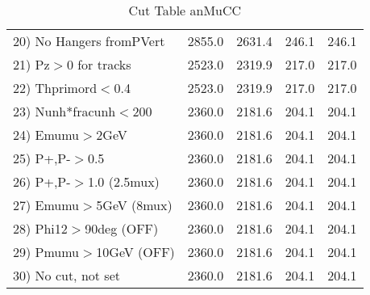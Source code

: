 \begin{table}[h!]
\begin{tabular}{||l||r|r|r|r||}
 20) No Hangers fromPVert &      2855.0 &      2631.4 &       246.1 &       246.1 \\
 21) Pz$>$0 for tracks    &      2523.0 &      2319.9 &       217.0 &       217.0 \\
 22) Thprimord$<$0.4      &      2523.0 &      2319.9 &       217.0 &       217.0 \\
 23) Nunh*fracunh$<$200   &      2360.0 &      2181.6 &       204.1 &       204.1 \\
 24) Emumu$>$2GeV         &      2360.0 &      2181.6 &       204.1 &       204.1 \\
 25) P+,P-$>$0.5          &      2360.0 &      2181.6 &       204.1 &       204.1 \\
 26) P+,P-$>$1.0 (2.5mux) &      2360.0 &      2181.6 &       204.1 &       204.1 \\
 27) Emumu$>$5GeV  (8mux) &      2360.0 &      2181.6 &       204.1 &       204.1 \\
 28) Phi12$>$90deg  (OFF) &      2360.0 &      2181.6 &       204.1 &       204.1 \\
 29) Pmumu$>$10GeV  (OFF) &      2360.0 &      2181.6 &       204.1 &       204.1 \\
 30) No cut, not set      &      2360.0 &      2181.6 &       204.1 &       204.1 \\
 \hline
 \hline
 \end{tabular}
 \caption{Cut Table  anMuCC }
 \label{tab-cut_anmcc}
 \end{table}

